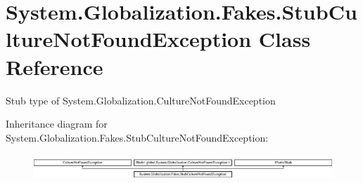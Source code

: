 \hypertarget{class_system_1_1_globalization_1_1_fakes_1_1_stub_culture_not_found_exception}{\section{System.\-Globalization.\-Fakes.\-Stub\-Culture\-Not\-Found\-Exception Class Reference}
\label{class_system_1_1_globalization_1_1_fakes_1_1_stub_culture_not_found_exception}
}


Stub type of System.\-Globalization.\-Culture\-Not\-Found\-Exception 


Inheritance diagram for System.\-Globalization.\-Fakes.\-Stub\-Culture\-Not\-Found\-Exception\-:\begin{figure}[H]
\begin{center}
\leavevmode
\includegraphics[height=0.979877cm]{class_system_1_1_globalization_1_1_fakes_1_1_stub_culture_not_found_exception}
\end{center}
\end{figure}
